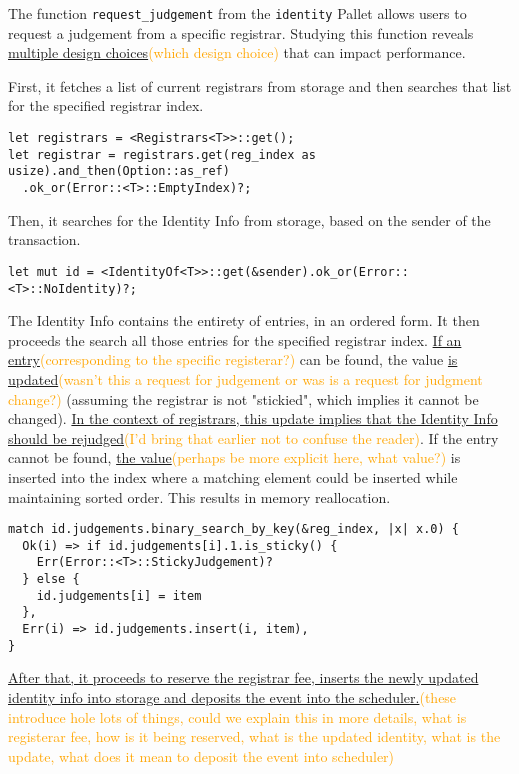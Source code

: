 \documentclass[11pt,a4paper]{article}
\newcommand{\syed}[2]{{\underline{#1}}\textcolor{orange}{(#2)}}
\begin{document}
The function \verb|request_judgement| from the \verb|identity| Pallet allows
users to request a judgement from a specific registrar. Studying this function
reveals \syed{multiple design choices}{which design choice} that can impact performance.
\newline

First, it fetches a list of current registrars from storage and then searches
that list for the specified registrar index.

\begin{verbatim}
let registrars = <Registrars<T>>::get();
let registrar = registrars.get(reg_index as usize).and_then(Option::as_ref)
  .ok_or(Error::<T>::EmptyIndex)?;
\end{verbatim}

Then, it searches for the Identity Info from storage, based on the sender of the
transaction.

\begin{verbatim}
let mut id = <IdentityOf<T>>::get(&sender).ok_or(Error::<T>::NoIdentity)?;
\end{verbatim}

The Identity Info contains the entirety of entries, in an ordered form. It then
proceeds the search all those entries for the specified registrar index. \syed{If an
entry}{corresponding to the specific registerar?} can be found, the value \syed{is updated}{wasn't this a request for judgement or was is a request for judgment change?} (assuming the registrar is not
"stickied", which implies it cannot be changed). \syed{In the context of registrars,
this update implies that the Identity Info should be rejudged}{I'd bring that earlier not to confuse the reader}. If the entry
cannot be found, \syed{the value}{perhaps be more explicit here, what value?} is inserted into the index where a matching element
could be inserted while maintaining sorted order. This results in memory
reallocation.

\begin{verbatim}
match id.judgements.binary_search_by_key(&reg_index, |x| x.0) {
  Ok(i) => if id.judgements[i].1.is_sticky() {
    Err(Error::<T>::StickyJudgement)?
  } else {
    id.judgements[i] = item
  },
  Err(i) => id.judgements.insert(i, item),
}
\end{verbatim}

\syed{After that, it proceeds to reserve the registrar fee, inserts the newly updated
identity info into storage and deposits the event into the scheduler.}{these introduce hole lots of things, could we explain this in more details, what is registerar fee, how is it being reserved, what is the updated identity, what is the update, what does it mean to deposit the event into scheduler}
\end{document}
